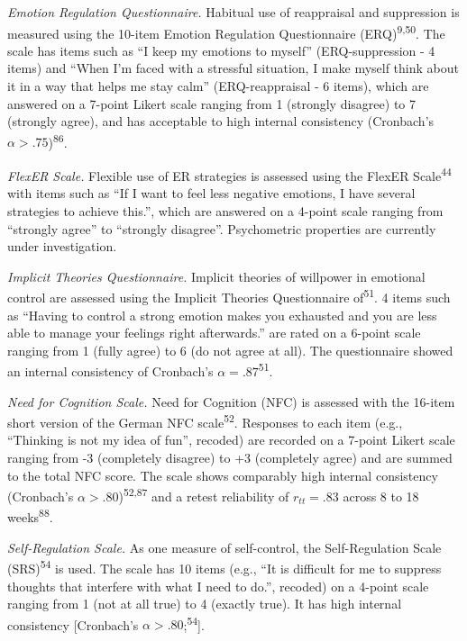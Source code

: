 \documentclass[
  man,floatsintext]{apa6}
\begin{document}
\emph{Emotion Regulation Questionnaire.} Habitual use of reappraisal and suppression is measured using the 10-item Emotion Regulation Questionnaire (ERQ)\textsuperscript{9,50}.
The scale has items such as ``I keep my emotions to myself'' (ERQ-suppression - 4 items) and ``When I'm faced with a stressful situation, I make myself think about it in a way that helps me stay calm'' (ERQ-reappraisal - 6 items), which are answered on a 7-point Likert scale ranging from 1 (strongly disagree) to 7 (strongly agree), and has acceptable to high internal consistency (Cronbach's \(\alpha>.75\))\textsuperscript{86}.

\emph{FlexER Scale.} Flexible use of ER strategies is assessed using the FlexER Scale\textsuperscript{44} with items such as ``If I want to feel less negative emotions, I have several strategies to achieve this.'', which are answered on a 4-point scale ranging from ``strongly agree'' to ``strongly disagree''.
Psychometric properties are currently under investigation.

\emph{Implicit Theories Questionnaire.} Implicit theories of willpower in emotional control are assessed using the Implicit Theories Questionnaire of\textsuperscript{51}.
4 items such as ``Having to control a strong emotion makes you exhausted and you are less able to manage your feelings right afterwards.'' are rated on a 6-point scale ranging from 1 (fully agree) to 6 (do not agree at all).
The questionnaire showed an internal consistency of Cronbach's \(\alpha=.87\)\textsuperscript{51}.

\emph{Need for Cognition Scale.} Need for Cognition (NFC) is assessed with the 16-item short version of the German NFC scale\textsuperscript{52}. Responses to each item (e.g., ``Thinking is not my idea of fun'', recoded) are recorded on a 7-point Likert scale ranging from -3 (completely disagree) to +3 (completely agree) and are summed to the total NFC score. The scale shows comparably high internal consistency (Cronbach's \(\alpha>.80\))\textsuperscript{52,87} and a retest reliability of \(r_{tt}=.83\) across 8 to 18 weeks\textsuperscript{88}.

\emph{Self-Regulation Scale.} As one measure of self-control, the Self-Regulation Scale (SRS)\textsuperscript{54} is used. The scale has 10 items (e.g., ``It is difficult for me to suppress thoughts that interfere with what I need to do.'', recoded) on a 4-point scale ranging from 1 (not at all true) to 4 (exactly true). It has high internal consistency {[}Cronbach's \(\alpha>.80\);\textsuperscript{54}{]}.
\end{document}
